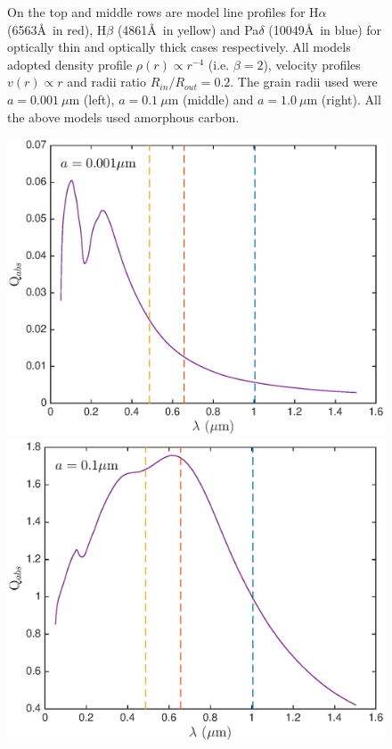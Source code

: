 \documentclass[useAMS,usenatbib,usegraphicx]{mnras}
\begin{document}
\begin{figure}
\caption{On the top and middle rows are model line profiles for H$\alpha$ (6563\AA\ in red), H$\beta$ (4861\AA\ in yellow) and Pa$\delta$ (10049\AA\ in blue) for optically thin and  optically thick cases respectively.  All models adopted density profile $\rho(r) \propto r^{-4}$ (i.e. $\beta = 2$), velocity profiles $v(r) \propto r$ and radii ratio $R_{in}/R_{out}=0.2$.  The grain radii used were $a=0.001~\mu$m (left), $a=0.1~\mu$m (middle) and $a=1.0~\mu$m (right). All the above models used amorphous carbon.}
\label{wav_dep}
\end{figure}

\begin{figure}
\includegraphics[trim =30 10 45 15,clip=true,scale=0.35]{Qabs_a0_001}
\includegraphics[trim =51 10 45 15,clip=true,scale=0.35]{Qabs_a0_1}

\end{figure}
\end{document}
